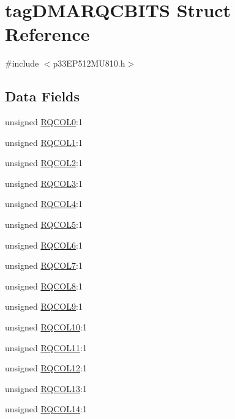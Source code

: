 \hypertarget{structtag_d_m_a_r_q_c_b_i_t_s}{}\section{tag\+D\+M\+A\+R\+Q\+C\+B\+I\+TS Struct Reference}
\label{structtag_d_m_a_r_q_c_b_i_t_s}


{\ttfamily \#include $<$p33\+E\+P512\+M\+U810.\+h$>$}

\subsection*{Data Fields}
\begin{DoxyCompactItemize}
\item 
unsigned \hyperlink{structtag_d_m_a_r_q_c_b_i_t_s_a2fadcadcf3f742afd3e990a6b2bcf862}{R\+Q\+C\+O\+L0}\+:1
\item 
unsigned \hyperlink{structtag_d_m_a_r_q_c_b_i_t_s_aadd24941a59eb3733ce121a564f84898}{R\+Q\+C\+O\+L1}\+:1
\item 
unsigned \hyperlink{structtag_d_m_a_r_q_c_b_i_t_s_a3c744220a9f3bba2de8bb2eccd7d581d}{R\+Q\+C\+O\+L2}\+:1
\item 
unsigned \hyperlink{structtag_d_m_a_r_q_c_b_i_t_s_a76c4ef166462505d8bb3863920ae3900}{R\+Q\+C\+O\+L3}\+:1
\item 
unsigned \hyperlink{structtag_d_m_a_r_q_c_b_i_t_s_ae965ede69e787c3e86067fc16cd5ff90}{R\+Q\+C\+O\+L4}\+:1
\item 
unsigned \hyperlink{structtag_d_m_a_r_q_c_b_i_t_s_ada546d59eefb35a9de2f9855e0073ff7}{R\+Q\+C\+O\+L5}\+:1
\item 
unsigned \hyperlink{structtag_d_m_a_r_q_c_b_i_t_s_a52e0003bd01bacd4c8cfef4956054a4f}{R\+Q\+C\+O\+L6}\+:1
\item 
unsigned \hyperlink{structtag_d_m_a_r_q_c_b_i_t_s_a2215b1e7f92e9a3980228f9ed460c29e}{R\+Q\+C\+O\+L7}\+:1
\item 
unsigned \hyperlink{structtag_d_m_a_r_q_c_b_i_t_s_a92733b432447a40b71582f666a173e39}{R\+Q\+C\+O\+L8}\+:1
\item 
unsigned \hyperlink{structtag_d_m_a_r_q_c_b_i_t_s_ad54e518a108da080cc516ee1a70769f3}{R\+Q\+C\+O\+L9}\+:1
\item 
unsigned \hyperlink{structtag_d_m_a_r_q_c_b_i_t_s_a18c86838b4f0f44c7bc125aebc2cc669}{R\+Q\+C\+O\+L10}\+:1
\item 
unsigned \hyperlink{structtag_d_m_a_r_q_c_b_i_t_s_aa3d860ac19fc6bd6814cf96f77741b69}{R\+Q\+C\+O\+L11}\+:1
\item 
unsigned \hyperlink{structtag_d_m_a_r_q_c_b_i_t_s_a0bfa2a163f7d2dd4ce4b8addebc41782}{R\+Q\+C\+O\+L12}\+:1
\item 
unsigned \hyperlink{structtag_d_m_a_r_q_c_b_i_t_s_afd2b25f888e1b56944c49dbf93a3e076}{R\+Q\+C\+O\+L13}\+:1
\item 
unsigned \hyperlink{structtag_d_m_a_r_q_c_b_i_t_s_a8e2ceaa626983fdab3e2aca15ea5a64b}{R\+Q\+C\+O\+L14}\+:1
\end{DoxyCompactItemize}


